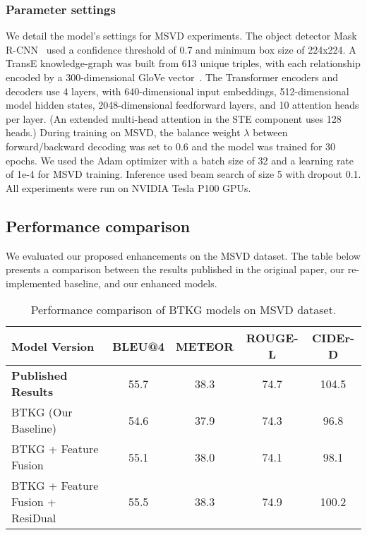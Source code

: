 \subsubsection{Parameter settings}

We detail the model's settings for MSVD experiments. The object detector Mask R-CNN~\cite{he2017mask} used a confidence threshold of 0.7 and minimum box size of 224x224. A TransE knowledge-graph was built from 613 unique triples, with each relationship encoded by a 300-dimensional GloVe vector~\cite{pennington-etal-2014-glove}. The Transformer encoders and decoders use 4 layers, with 640-dimensional input embeddings, 512-dimensional model hidden states, 2048-dimensional feedforward layers, and 10 attention heads per layer. (An extended multi-head attention in the STE component uses 128 heads.) During training on MSVD, the balance weight $\lambda$ between forward/backward decoding was set to 0.6 and the model was trained for 30 epochs. We used the Adam optimizer with a batch size of 32 and a learning rate of 1e-4 for MSVD training. Inference used beam search of size 5 with dropout 0.1. All experiments were run on NVIDIA Tesla P100 GPUs.

\subsection{Performance comparison}

We evaluated our proposed enhancements on the MSVD dataset. The table below presents a comparison between the results published in the original paper, our re-implemented baseline, and our enhanced models.

\begin{table}[H]
  \centering
  \renewcommand{\arraystretch}{1.5}
  \normalsize
  \label{tab:model_comparison}
  \begin{tabular}{lcccc}
    \hline
    \textbf{Model Version} & \textbf{BLEU@4} &
    \textbf{METEOR} & \textbf{ROUGE-L} & \textbf{CIDEr-D} \\
    \hline
    \textbf{Published Results} & 55.7 & 38.3 & 74.7 & 104.5   \\
    BTKG (Our Baseline) & 54.6 & 37.9 & 74.3 & 96.8    \\
    BTKG + Feature Fusion & 55.1 & 38.0 & 74.1 & 98.1    \\
    BTKG + Feature Fusion + ResiDual & 55.5   & 38.3   & 74.9    & 100.2   \\
    \hline
  \end{tabular}
  \caption{Performance comparison of BTKG models on MSVD dataset.}
\end{table}

